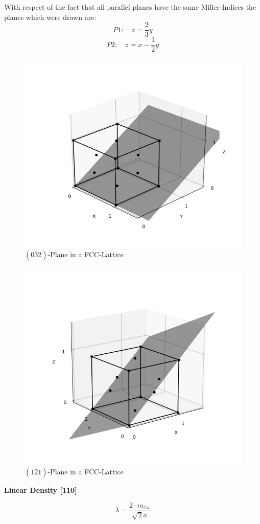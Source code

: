 With respect of the fact that all parallel planes have the same Miller-Indices the planes which were drawn are:
$$P1: \quad z = \frac{2}{3}y$$
$$P2: \quad z = x -\frac{1}{2}y$$

\begin{figure}[H]
	\centering
	\includegraphics[width=0.6\linewidth]{Graphics/Chapter1/PLANE032}
	\caption{$(0\overline{3}2)$-Plane in a FCC-Lattice}
	\label{}
\end{figure}


\begin{figure}[H]
	\centering
	\includegraphics[width=0.6\linewidth]{Graphics/Chapter1/PLANE121}
	\caption{$(\overline{1}21)$-Plane in a FCC-Lattice}
	\label{}
\end{figure}


\textbf{Linear Density [110]}

$$\lambda = \frac{2 \cdot m_{Ca}}{\sqrt{2}a}$$
